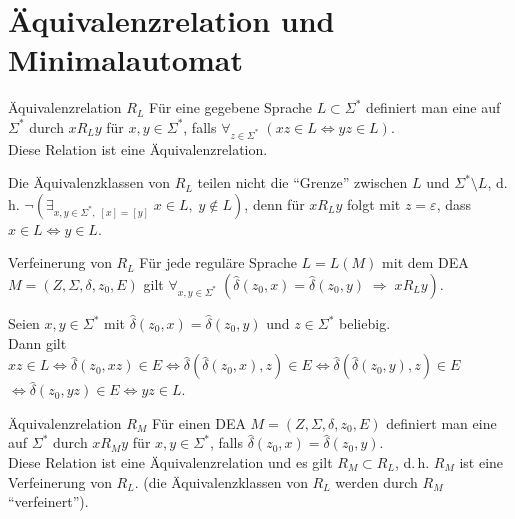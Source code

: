 \section{%
    Äquivalenzrelation und Minimalautomat%
}

\begin{Def}{Äquivalenzrelation $R_L$}
    Für eine gegebene Sprache $L \subset \Sigma^\ast$ definiert man eine
     auf $\Sigma^\ast$ durch
    $x R_L y$ für $x, y \in \Sigma^\ast$, falls
    $\forall_{z \in \Sigma^\ast}\; (xz \in L \iff yz \in L)$.\\
    Diese Relation ist eine Äquivalenzrelation.
\end{Def}

\begin{Bem}
    Die Äquivalenzklassen von $R_L$ teilen nicht die "`Grenze"' zwischen $L$
    und $\Sigma^\ast \setminus L$, d.\,h.
    $\lnot (\exists_{x, y \in \Sigma^\ast,\; [x] = [y]}\; x \in L,\;
    y \notin L)$,
    denn für $x R_L y$ folgt mit $z = \varepsilon$,
    dass $x \in L \iff y \in L$.
\end{Bem}

\begin{Lemma}{Verfeinerung von $R_L$}
    Für jede reguläre Sprache $L = L(M)$ mit dem DEA\\
    $M = (Z, \Sigma, \delta, z_0, E)$ gilt
    $\forall_{x, y \in \Sigma^\ast}\;
    (\widehat{\delta}(z_0, x) = \widehat{\delta}(z_0, y)
    \;\Rightarrow\; x R_L y)$.
\end{Lemma}

\begin{Beweis}
    Seien $x, y \in \Sigma^\ast$ mit
    $\widehat{\delta}(z_0, x) = \widehat{\delta}(z_0, y)$ und
    $z \in \Sigma^\ast$ beliebig.\\
    Dann gilt $xz \in L
    \iff \widehat{\delta}(z_0, xz) \in E
    \iff \widehat{\delta}(\widehat{\delta}(z_0, x), z) \in E
    \iff \widehat{\delta}(\widehat{\delta}(z_0, y), z) \in E$\\
    $\iff \widehat{\delta}(z_0, yz) \in E
    \iff yz \in L$.
\end{Beweis}

\begin{Def}{Äquivalenzrelation $R_M$}
    Für einen DEA $M = (Z, \Sigma, \delta, z_0, E)$ definiert man eine
     auf $\Sigma^\ast$ durch
    $x R_M y$ für $x, y \in \Sigma^\ast$, falls
    $\widehat{\delta}(z_0, x) = \widehat{\delta}(z_0, y)$.\\
    Diese Relation ist eine Äquivalenzrelation und es gilt $R_M \subset R_L$,
    d.\,h. $R_M$ ist eine Verfeinerung von $R_L$.
    (die Äquivalenzklassen von $R_L$ werden durch $R_M$ "`verfeinert"').
\end{Def}


